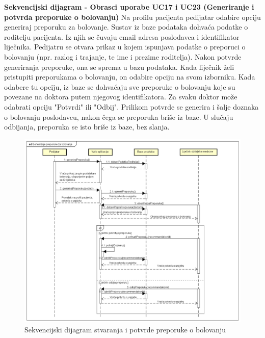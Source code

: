 				\textbf{Sekvencijski dijagram - Obrasci uporabe UC17 i UC23 (Generiranje i potvrda preporuke o bolovanju)}\newline
					\text Na profilu pacijenta pedijatar odabire opciju generiraj preporuku za bolovanje. Sustav iz baze podataka dohvaća podatke o roditelju pacijenta. Iz njih se čuvaju email adresa poslodavca i identifikator liječnika. Pedijatru se otvara prikaz u kojem ispunjava podatke o preporuci o bolovanju (npr. razlog i trajanje, te ime i prezime roditelja). Nakon potvrde generiranja preporuke, ona se sprema u bazu podataka.
					Kada liječnik želi pristupiti preporukama o bolovanju, on odabire opciju na svom izborniku. Kada odabere tu opciju, iz baze se dohvaćaju sve preporuke o bolovanju koje su povezane na doktora putem njegovog identifikatora. Za svaku doktor može odabrati opciju "Potvrdi" ili "Odbij". Prilikom potvrde se generira i šalje doznaka o bolovanju poslodavcu, nakon čega se preporuka briše iz baze. U slučaju odbijanja, preporuka se isto briše iz baze, bez slanja.
					\begin{figure}[H]
						\includegraphics[scale=0.4]{dijagrami/pedseq2.PNG} %
						\centering
						\caption{Sekvencijski dijagram stvaranja i potvrde preporuke o bolovanju}
						\label{fig:seq3}
					\end{figure}
					\clearpage
					

